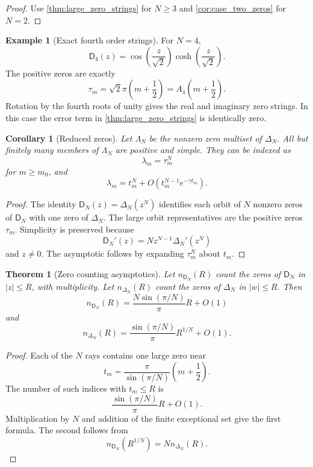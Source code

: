 \documentclass{aomart}
\newtheorem{theorem}{Theorem}[section]
\newtheorem{corollary}[corollary]{Corollary}
\theoremstyle{definition}
\newtheorem{example}[example]{Example}
\theoremstyle{remark}
\newcommand{\Dfun}{\mathsf D}
\begin{document}
\begin{proof}
Use \cref{thm:large_zero_strings} for $N\geq3$ and \cref{cor:case_two_zeros} for $N=2$.
\end{proof}


\begin{example}[Exact fourth order strings]\label{ex:fourth_order_zeros}
For $N=4$,
\[
\Dfun_4(z)
=
\cos\left(\frac z{\sqrt2}\right)
\cosh\left(\frac z{\sqrt2}\right).
\]
The positive zeros are exactly
\[
\tau_m
=
\sqrt2\pi\left(m+\frac12\right)
=
A_4\left(m+\frac12\right).
\]
Rotation by the fourth roots of unity gives the real and imaginary zero strings.  In this case the error term in \cref{thm:large_zero_strings} is identically zero.
\end{example}

\begin{corollary}[Reduced zeros]\label{cor:reduced_zeros}
Let $\Lambda_N$ be the nonzero zero multiset of $\Delta_N$.  All but finitely many members of $\Lambda_N$ are positive and simple.  They can be indexed as
\[
\lambda_m=\tau_m^N
\]
for $m\geq m_0$, and
\[
\lambda_m
=
 t_m^N
+O\left(t_m^{N-1}e^{-\gamma t_m}\right).
\]
\end{corollary}

\begin{proof}
The identity $\Dfun_N(z)=\Delta_N(z^N)$ identifies each orbit of $N$ nonzero zeros of $\Dfun_N$ with one zero of $\Delta_N$.  The large orbit representatives are the positive zeros $\tau_m$.  Simplicity is preserved because
\[
\Dfun_N'(z)=Nz^{N-1}\Delta_N'(z^N)
\]
and $z\ne0$.  The asymptotic follows by expanding $\tau_m^N$ about $t_m$.
\end{proof}

\begin{theorem}[Zero counting asymptotics]\label{thm:zero_counting}
Let $n_{\Dfun_N}(R)$ count the zeros of $\Dfun_N$ in $|z|\leq R$, with multiplicity.  Let $n_{\Delta_N}(R)$ count the zeros of $\Delta_N$ in $|w|\leq R$.  Then
\[
n_{\Dfun_N}(R)
=
\frac{N\sin(\pi/N)}{\pi}R+O(1)
\]
and
\[
n_{\Delta_N}(R)
=
\frac{\sin(\pi/N)}{\pi}R^{1/N}+O(1).
\]
\end{theorem}

\begin{proof}
Each of the $N$ rays contains one large zero near
\[
 t_m=\frac\pi{\sin(\pi/N)}\left(m+\frac12\right).
\]
The number of such indices with $t_m\leq R$ is
\[
\frac{\sin(\pi/N)}\pi R+O(1).
\]
Multiplication by $N$ and addition of the finite exceptional set give the first formula.  The second follows from
\[
n_{\Dfun_N}(R^{1/N})=Nn_{\Delta_N}(R).
\]
\end{proof}
\end{document}

